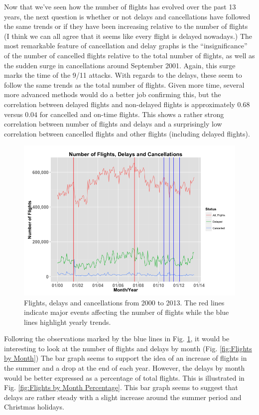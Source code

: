 \documentclass[11pt,twoside,titlepage]{article}
\begin{document}
Now that we've seen how the number of flights has evolved over the past 13 years, the next question is whether or not delays and cancellations have followed the same trends or if they have been increasing relative to the number of flights (I think we can all agree that it seems like every flight is delayed nowadays.) The most remarkable feature of cancellation and delay graphs is the ``insignificance'' of the number of cancelled flights relative to the total number of flights, as well as the sudden surge in cancellations around September 2001. Again, this surge marks the time of the 9/11 attacks. With regards to the delays, these seem to follow the same trends as the total number of flights. Given more time, several more advanced methods would do a better job confirming this, but the correlation between delayed flights and non-delayed flights is approximately $0.68$ versus $0.04$ for cancelled and on-time flights. This shows a rather strong correlation between number of flights and delays and a surprisingly low correlation between cancelled flights and other flights (including delayed flights).

\begin{figure}[h!]
        \centering
                \includegraphics[width=17cm]{Number_of_Flights2.png}
        \caption{Flights, delays and cancellations from 2000 to 2013. The red lines indicate major events affecting the number of flights while the blue lines highlight yearly trends.}\label{fig:Number of Flights + Delays}
\end{figure}

Following the observations marked by the blue lines in Fig. \ref{fig:Number of Flights + Delays}, it would be interesting to look at the number of flights and delays by month (Fig. \ref{fig:Flights by Month}) The bar graph seems to support the idea of an increase of flights in the summer and a drop at the end of each year. However, the delays by month would be better expressed as a percentage of total flights. This is illustrated in Fig. \ref{fig:Flights by Month Percentage}. This bar graph seems to suggest that delays are rather steady with a slight increase around the summer period and Christmas holidays.
\end{document}
